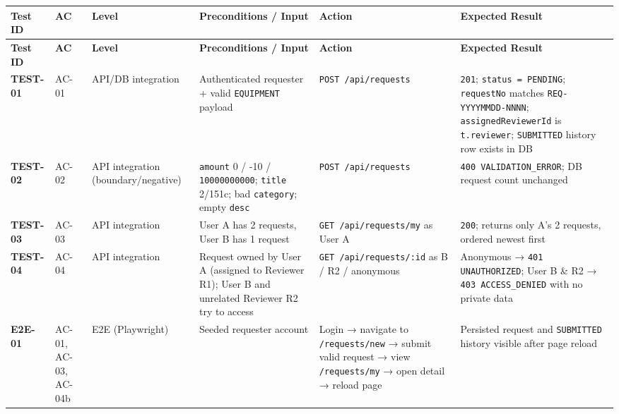 \documentclass[11pt,a4paper]{article}
\begin{document}
\small
\vspace{0.3em}
\begin{longtable}{|>{\RaggedRight}p{1.6cm}|>{\centering\arraybackslash}p{1.4cm}|>{\centering\arraybackslash}p{1.2cm}|>{\RaggedRight}p{3.8cm}|>{\RaggedRight}p{3.8cm}|>{\RaggedRight}p{4.0cm}|}
\hline
\rowcolor{zenPale}\textbf{Test ID} & \textbf{AC} & \textbf{Level} & \textbf{Preconditions / Input} & \textbf{Action} & \textbf{Expected Result} \\ \hline
\endfirsthead
\hline
\rowcolor{zenPale}\textbf{Test ID} & \textbf{AC} & \textbf{Level} & \textbf{Preconditions / Input} & \textbf{Action} & \textbf{Expected Result} \\ \hline
\endhead
\hline
\endfoot
\textbf{TEST-01} & AC-01 & API/DB integration & Authenticated requester + valid \texttt{EQUIPMENT} payload & \texttt{POST /\allowbreak api/\allowbreak requests} & \texttt{201}; \texttt{status = PENDING}; \texttt{requestNo} matches \texttt{REQ-\allowbreak YYYYMMDD-\allowbreak NNNN}; \texttt{assignedReviewerId} is \texttt{t.\allowbreak reviewer}; \texttt{SUBMITTED} history row exists in DB \\ \hline
\textbf{TEST-02} & AC-02 & API integration (boundary/negative) & \texttt{amount} 0 / -10 / \allowbreak\texttt{10000000000}; \texttt{title} 2/151c; bad \texttt{category}; empty \texttt{desc} & \texttt{POST /\allowbreak api/\allowbreak requests} & \texttt{400 VALIDATION\_\allowbreak ERROR}; DB request count unchanged \\ \hline
\textbf{TEST-03} & AC-03 & API integration & User A has 2 requests, User B has 1 request & \texttt{GET /\allowbreak api/\allowbreak requests/\allowbreak my} as User A & \texttt{200}; returns only A's 2 requests, ordered newest first \\ \hline
\textbf{TEST-04} & AC-04 & API integration & Request owned by User A (assigned to Reviewer R1); User B and unrelated Reviewer R2 try to access & \texttt{GET /\allowbreak api/\allowbreak requests/\allowbreak :\allowbreak id} as B / R2 / anonymous & Anonymous → \texttt{401 UNAUTHORIZED}; User B \& R2 → \texttt{403 ACCESS\_\allowbreak DENIED} with no private data \\ \hline
\textbf{E2E-01} & AC-01, AC-03, AC-04b & E2E (Playwright) & Seeded requester account & Login → navigate to \texttt{/\allowbreak requests/\allowbreak new} → submit valid request → view \texttt{/\allowbreak requests/\allowbreak my} → open detail → reload page & Persisted request and \texttt{SUBMITTED} history visible after page reload \\ \hline
\end{longtable}
\vspace{0.3em}
\end{document}
